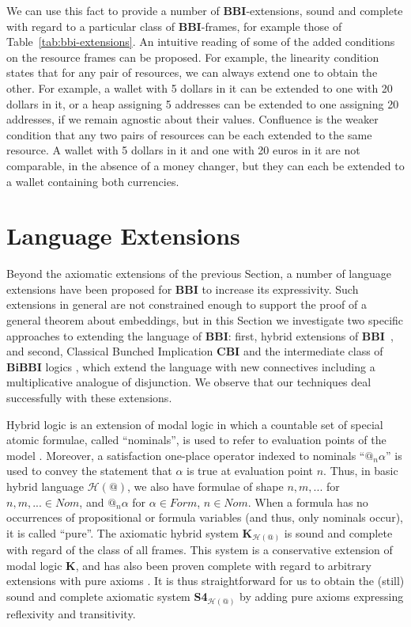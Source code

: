 \documentclass[a4paper]{article}
\newcommand{\BBI}{\textbf{BBI}\xspace}
\newcommand{\SFour}{\textbf{S4}\xspace}
\begin{document}
We can use this fact to provide a number of \BBI-extensions, sound and complete with regard to a particular class of \BBI-frames, for example those of Table~\ref{tab:bbi-extensions}. An intuitive reading of some of the added conditions on the resource frames can be proposed. For example, the linearity condition states that for any pair of resources, we can always extend one to obtain the other. For example, a wallet with 5 dollars in it can be extended to one with 20 dollars in it, or a heap assigning 5 addresses can be extended to one assigning 20 addresses, if we remain agnostic about their values. Confluence is the weaker condition that any two pairs of resources can be each extended to the same resource. A wallet with 5 dollars in it and one with 20 euros in it are not comparable, in the absence of a money changer, but they can each be extended to a wallet containing both currencies.


\section{Language Extensions}
\label{Sec:language_ext}

Beyond the axiomatic extensions of the previous Section, a number of language extensions have been proposed for \BBI to increase its expressivity. Such extensions in general are not constrained enough to support the proof of a general theorem about embeddings, but in this Section we investigate two specific approaches to extending the language of \BBI: first, hybrid extensions of \BBI~\cite{separation_theories}, and second, Classical Bunched Implication \textbf{CBI} \cite{CBI_Axioms} and the intermediate class of \textbf{BiBBI} logics \cite{intermediateBBI}, which extend the language with new connectives including a multiplicative analogue of disjunction. We observe that our techniques deal successfully with these extensions.

Hybrid logic is an extension of modal logic in which a countable set of special atomic formulae, called ``nominals'', is used to refer to evaluation points of the model \cite{Hybrid_Logic_Pure_extensions}. Moreover, a satisfaction one-place operator indexed to nominals ``$@_n \alpha$'' is used to convey the statement that $\alpha$ is true at evaluation point $n$. Thus, in basic hybrid language $\mathcal{H}(@)$, we also have formulae of shape $n, m,...$ for $n, m, ... \in Nom$, and $@_n \alpha$ for $\alpha \in Form$, $n\in Nom$. When a formula has no occurrences of propositional or formula variables (and thus, only nominals occur), it is called ``pure''. The axiomatic hybrid system \textbf{K}$_{\mathcal{H}(@)}$ is sound and complete with regard of the class of all frames. This system is a conservative extension of modal logic \textbf{K}, and has also been proven complete with regard to arbitrary extensions with pure axioms \cite{Hybrid_Logic_Pure_extensions}. It is thus straightforward for us to obtain the (still) sound and complete axiomatic system \SFour$_{\mathcal{H}(@)}$ by adding pure axioms expressing reflexivity and transitivity.
\end{document}
